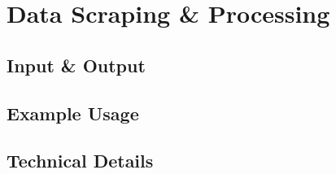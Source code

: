 \section{Data Scraping \& Processing}

\subsection{Input \& Output}

\subsection{Example Usage}

\subsection{Technical Details}

\newpage

